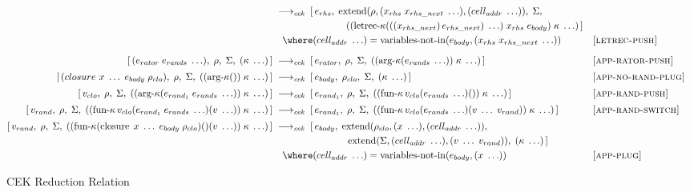 \begin{figure}[!h]
{\begin{minipage}{\textwidth}
\begin{align*}
        &\;\longrightarrow_{\textit{cek}}\;
        [\,e_{rhs},\;
          \operatorname{extend}(\rho,(x_{rhs}\;x_{rhs\_next}\;\ldots),(cell_{addr}\;\ldots)),\;\Sigma,\\
        &\hspace{7.6em}
          ((\operatorname{letrec-\kappa}(((x_{rhs\_next})\,e_{rhs\_next})\;\ldots)\;x_{rhs}\;e_{body})\;\kappa\;\ldots)\,] \\
        &\hspace{1em}
          \where (cell_{addr}\;\ldots)=\operatorname{variables-not-in}(e_{body},(x_{rhs}\;x_{rhs\_next}\;\ldots))
        &&\textsc{[letrec‑push]}\\[6pt]
%
        [\,(e_{rator}\;e_{rands}\;\ldots),\;\rho,\;\Sigma,\;(\kappa\;\ldots)\,]
        &\;\longrightarrow_{\textit{cek}}\;
        [\,e_{rator},\;\rho,\;\Sigma,\;((\operatorname{arg-\kappa}(e_{rands}\;\ldots))\;\kappa\;\ldots)\,]
        &&\textsc{[app‑rator‑push]}\\[2pt]
%
        [\,(closure\ x\;\ldots\;e_{body}\;\rho_{clo}),\;\rho,\;\Sigma,\;((\operatorname{arg-\kappa}())\;\kappa\;\ldots)\,]
        &\;\longrightarrow_{\textit{cek}}\;
        [\,e_{body},\;\rho_{clo},\;\Sigma,\;(\kappa\;\ldots)\,]
        &&\textsc{[app‑no‑rand‑plug]}\\[2pt]
%
        [\,v_{clo},\;\rho,\;\Sigma,\;((\operatorname{arg-\kappa}(e_{rand_1}\;e_{rands}\;\ldots))\;\kappa\;\ldots)\,]
        &\;\longrightarrow_{\textit{cek}}\;
        [\,e_{rand_1},\;\rho,\;\Sigma,\;((\operatorname{fun-\kappa}v_{clo}(e_{rands}\;\ldots)())\;\kappa\;\ldots)\,]
        &&\textsc{[app‑rand‑push]}\\[2pt]
%
        [\,v_{rand},\;\rho,\;\Sigma,\;((\operatorname{fun-\kappa}v_{clo}(e_{rand_1}\;e_{rands}\;\ldots)(v\;\ldots))\;\kappa\;\ldots)\,]
        &\;\longrightarrow_{\textit{cek}}\;
        [\,e_{rand_1},\;\rho,\;\Sigma,\;((\operatorname{fun-\kappa}v_{clo}(e_{rands}\;\ldots)(v\;\ldots\;v_{rand}))\;\kappa\;\ldots)\,]
        &&\textsc{[app‑rand‑switch]}\\[2pt]
%
        [\,v_{rand},\;\rho,\;\Sigma,\;((\operatorname{fun-\kappa}
            (\operatorname{closure}\;x\;\ldots\;e_{body}\;\rho_{clo})() (v\;\ldots))\;\kappa\;\ldots)\,]
        &\;\longrightarrow_{\textit{cek}}\;
        [\,e_{body},\;
          \operatorname{extend}(\rho_{clo},(x\;\ldots),(cell_{addr}\;\ldots)),\\
        &\hspace{7.6em}
          \operatorname{extend}(\Sigma,(cell_{addr}\;\ldots),(v\;\ldots\;v_{rand})),\;(\kappa\;\ldots)\,] \\
        &\hspace{1em}
          \where (cell_{addr}\;\ldots)=\operatorname{variables-not-in}(e_{body},(x\;\ldots))
        &&\textsc{[app‑plug]}
      \end{align*}
    \end{minipage}%
  }
  \vspace{0.6em}
  \caption{CEK Reduction Relation}
  \label{fig:cek-reduction-relation-redacted}
\end{figure}
